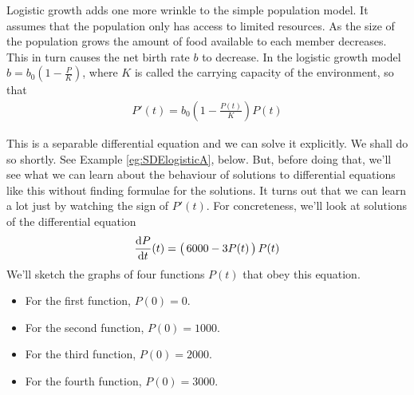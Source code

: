 Logistic growth adds one more wrinkle to the simple population model.
It assumes that the
population only has access to limited resources. As the size of the population
grows the amount of food available to each member decreases. This in turn
causes the net birth rate $b$ to decrease. In the logistic growth model
$b=b_0\left(1-\tfrac{P}{K}\right)$, where $K$ is called the carrying capacity
of the environment,  so that
\begin{align*}
  P'(t) =b_0\left(1-\frac{P(t)}{K}\right)P(t)
\end{align*}


This is a separable differential equation and we can solve it explicitly.
We shall do so shortly. See Example \ref{eg:SDElogisticA}, below.
But, before doing that, we'll see what we can learn about the behaviour
of solutions to differential equations like this without finding
formulae for the solutions. It turns out that we can learn a lot
just by watching the sign of $P'(t)$. For concreteness,
we'll look at solutions of the differential equation
\begin{align*}
  \diff{P}{t}(t)=\big(\,6000-3P(t)\,\big)\,P(t)
\end{align*}
We'll sketch the graphs of four functions $P(t)$ that obey this equation.
\begin{itemize} \itemsep1pt \parskip0pt
  \item    For the first function, $P(0)=0$.
  \item    For the second function, $P(0)=1000$.
  \item    For the third function, $P(0)=2000$.
  \item    For the fourth function, $P(0)=3000$.
\end{itemize}

